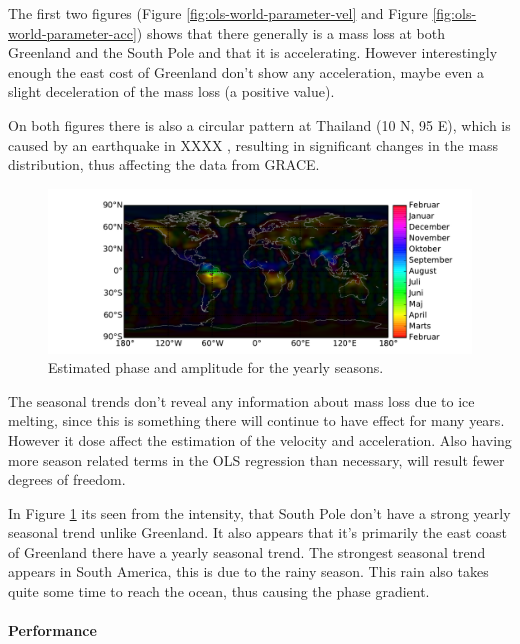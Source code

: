 The first two figures (Figure \ref{fig:ols-world-parameter-vel} and Figure \ref{fig:ols-world-parameter-acc}) shows that there generally is a mass loss at both Greenland and the South Pole and that it is accelerating. However interestingly enough the east cost of Greenland don't show any acceleration, maybe even a slight deceleration of the mass loss (a positive value).

On both figures there is also a circular pattern at Thailand (10 N, 95 E), which is caused by an earthquake in XXXX , resulting in significant changes in the mass distribution, thus affecting the data from GRACE.
\begin{figure}[H]
	\centering
	\includegraphics[width=\textwidth]{figures/ols-world-parameter-year}
	\caption{Estimated phase and amplitude for the yearly seasons.}
	\label{fig:ols-world-parameter-year}
\end{figure}

The seasonal trends don't reveal any information about mass loss due to ice melting, since this is something there will continue to have effect for many years. However it dose affect the estimation of the velocity and acceleration. Also having more season related terms in the OLS regression than necessary, will result fewer degrees of freedom.

In Figure \ref{fig:ols-world-parameter-year} its seen from the intensity, that South Pole don't have a strong yearly seasonal trend unlike Greenland. It also appears that it's primarily the east coast of Greenland there have a yearly seasonal trend. The strongest seasonal trend appears in South America, this is due to the rainy season. This rain also takes quite some time to reach the ocean, thus causing the phase gradient.

\paragraph{Performance} 

